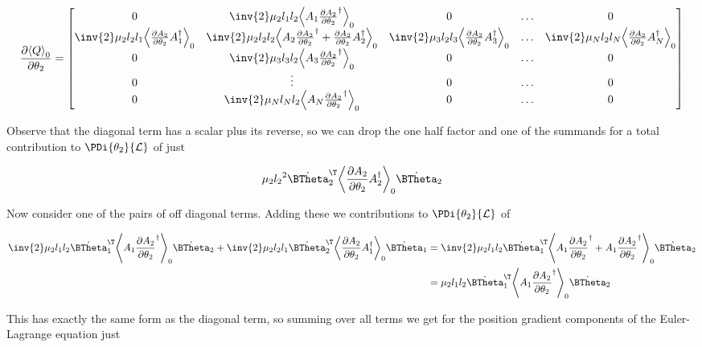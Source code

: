 \begin{align}\label{eqn:multiPendulumSpherical2:boo33}
\PD{\theta_2}{\gpgradezero{Q}}
=
\begin{bmatrix}
0 & \inv{2} \mu_2 l_1 l_2 \gpgradezero{A_1 \PD{\theta_2}{A_2}^\dagger} & 0 & \hdots & 0 \\
\inv{2} \mu_2 l_2 l_1 \gpgradezero{\PD{\theta_2}{A_2} A_1^\dagger} &
\inv{2} \mu_2 l_2 l_2 \gpgradezero{A_2 \PD{\theta_2}{A_2}^\dagger + \PD{\theta_2}{A_2} A_2^\dagger} &
\inv{2} \mu_3 l_2 l_3 \gpgradezero{\PD{\theta_2}{A_2} A_3^\dagger} & \hdots &
\inv{2} \mu_N l_2 l_N \gpgradezero{\PD{\theta_2}{A_2} A_N^\dagger} \\
0 & \inv{2} \mu_3 l_3 l_2 \gpgradezero{A_3 \PD{\theta_2}{A_2}^\dagger} & 0 & \hdots & 0 \\
0 & \vdots & 0 & \hdots & 0 \\
0 & \inv{2} \mu_N l_N l_2 \gpgradezero{A_N \PD{\theta_2}{A_2}^\dagger} & 0 & \hdots & 0 \\
\end{bmatrix}
\end{align}

Observe that the diagonal term has a scalar plus its reverse, so we can drop the one half factor and one of the summands for a total contribution to $\PDi{\theta_2}{\LL}$ of just

\begin{align*}
\mu_2 {l_2}^2 {\dot{\BTheta}_2}^\T \gpgradezero{\PD{\theta_2}{A_2} A_2^\dagger} \dot{\BTheta}_2
\end{align*}

Now consider one of the pairs of off diagonal terms.  Adding these we contributions to $\PDi{\theta_2}{\LL}$ of

\begin{align*}
\inv{2} \mu_2 l_1 l_2 
{\dot{\BTheta}_1}^\T
\gpgradezero{A_1 \PD{\theta_2}{A_2}^\dagger} 
\dot{\BTheta}_2
+\inv{2} \mu_2 l_2 l_1 
{\dot{\BTheta}_2}^\T
\gpgradezero{\PD{\theta_2}{A_2} A_1^\dagger} 
\dot{\BTheta}_1
&=
\inv{2} \mu_2 l_1 l_2 
{\dot{\BTheta}_1}^\T
\gpgradezero{
A_1 \PD{\theta_2}{A_2}^\dagger
+A_1 \PD{\theta_2}{A_2}^\dagger
} 
\dot{\BTheta}_2 \\
&=
\mu_2 l_1 l_2 
{\dot{\BTheta}_1}^\T
\gpgradezero{
A_1 \PD{\theta_2}{A_2}^\dagger
} 
\dot{\BTheta}_2 \\
\end{align*}

This has exactly the same form as the diagonal term, so summing over all terms we get for the position gradient components of the Euler-Lagrange equation just


